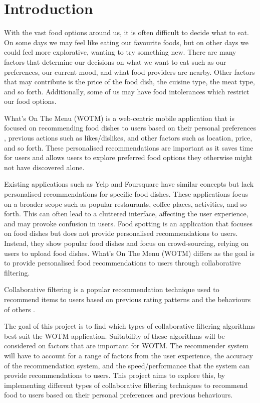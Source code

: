 \chapter{Introduction}\label{C:intro}

With the vast food options around us, it is often difficult to decide what to eat. On some days we may feel like eating our favourite foods, but on other days we could feel more explorative, wanting to try something new. There are many factors that determine our decisions on what we want to eat such as our preferences, our current mood, and what food providers are nearby. Other factors that may contribute is the price of the food dish, the cuisine type, the meat type, and so forth. Additionally, some of us may have food intolerances which restrict our food options.

What’s On The Menu (WOTM) is a web-centric mobile application that is focused on recommending food dishes to users based on their personal preferences , previous actions such as likes/dislikes, and other factors such as location, price, and so forth. These personalised recommendations are important as it saves time for users and allows users to explore preferred food options they otherwise might not have discovered alone. 

Existing applications such as Yelp and Foursquare have similar concepts but lack personalised recommendations for specific food dishes. These applications focus on a broader scope such as popular restaurants, coffee places, activities, and so forth. This can often lead to a cluttered interface, affecting the user experience, and may provoke confusion in users. Food spotting is an application that focuses on food dishes but does not provide personalised recommendations to users. Instead, they show popular food dishes and focus on crowd-sourcing, relying on users to upload food dishes. What's On The Menu (WOTM) differs as the goal is to provide personalised food recommendations to users through collaborative filtering. 

Collaborative filtering is a popular recommendation technique used to recommend items to users based on previous rating patterns and the behaviours of others \cite{itembased, schafer2007collaborative, survey}. 

The goal of this project is to find which types of collaborative filtering algorithms best suit the WOTM application. Suitability of these algorithms will be considered on factors that are important for WOTM. The recommender system will have to account for a range of factors from the user experience, the accuracy of the recommendation system, and the speed/performance that the system can provide recommendations to users. This project aims to explore this, by implementing different types of collaborative filtering techniques to recommend food to users based on their personal preferences and previous behaviours.


